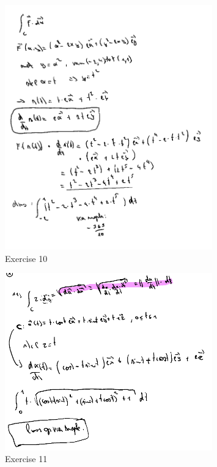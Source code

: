 \documentclass[a4paper]{article}
\begin{document}
\begin{figure}[H]
	\centering
	\includegraphics[width=0.8\textwidth]{assets/huis_6_ex_10.png}
	\caption{Exercise 10}
	\label{fig:huis_6_ex_10}
\end{figure}

\begin{figure}[H]
	\centering
	\includegraphics[width=0.8\textwidth]{assets/huis_6_ex_11.png}
	\caption{Exercise 11}
	\label{fig:huis_6_ex_11}
\end{figure}
\end{document}
